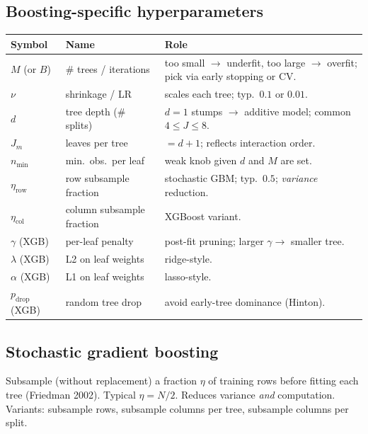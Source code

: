 \subsection{Boosting-specific hyperparameters}
\scriptsize
\begin{tabularx}{\linewidth}{@{}l l X@{}}
\toprule
Symbol & Name & Role \\
\midrule
$M$ (or $B$)         & \# trees / iterations  & too small $\to$ underfit, too large $\to$ overfit; pick via early stopping or CV. \\
$\nu$                & shrinkage / LR         & scales each tree; typ.\ $0.1$ or $0.01$. \\
$d$                  & tree depth (\# splits) & $d{=}1$ stumps $\to$ additive model; common $4\le J\le 8$. \\
$J_m$                & leaves per tree        & $=d+1$; reflects interaction order. \\
$n_{\min}$           & min.\ obs.\ per leaf   & weak knob given $d$ and $M$ are set. \\
$\eta_{\text{row}}$  & row subsample fraction & stochastic GBM; typ.\ $0.5$; \emph{variance} reduction. \\
$\eta_{\text{col}}$  & column subsample fraction & XGBoost variant. \\
$\gamma$ (XGB)       & per-leaf penalty       & post-fit pruning; larger $\gamma\to$ smaller tree. \\
$\lambda$ (XGB)      & L2 on leaf weights     & ridge-style. \\
$\alpha$ (XGB)       & L1 on leaf weights     & lasso-style. \\
$p_{\text{drop}}$ (XGB) & random tree drop    & avoid early-tree dominance (Hinton). \\
\bottomrule
\end{tabularx}
\normalsize

\subsection{Stochastic gradient boosting}
Subsample (without replacement) a fraction $\eta$ of training rows before fitting each tree (Friedman 2002). Typical $\eta=N/2$. Reduces variance \emph{and} computation. Variants: subsample rows, subsample columns per tree, subsample columns per split.

